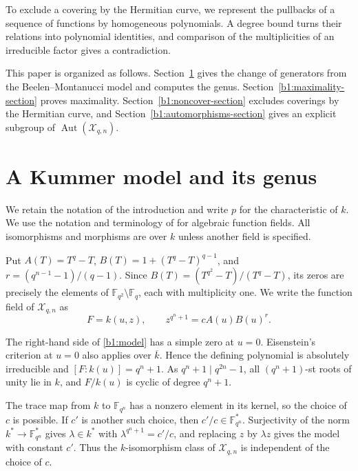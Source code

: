 \documentclass[10pt,a4paper]{amsart}
\numberwithin{equation}{section}
\newcommand{\F}{\mathbb F}
\DeclareMathOperator{\Aut}{Aut}
\begin{document}
To exclude a covering by the Hermitian curve, we represent the
pullbacks of a sequence of functions by homogeneous polynomials.
A degree bound turns their relations into polynomial identities,
and comparison of the multiplicities of an irreducible factor
gives a contradiction.

This paper is organized as follows. Section~\ref{b1:model-section} gives the change of generators from the
Beelen--Montanucci model and computes the genus.
Section~\ref{b1:maximality-section} proves maximality.
Section~\ref{b1:noncover-section} excludes coverings by the Hermitian
curve, and Section~\ref{b1:automorphisms-section} gives an explicit
subgroup of \(\Aut(\mathcal X_{q,n})\).


\section{A Kummer model and its genus}
\label{b1:model-section}

We retain the notation of the introduction and write \(p\) for the
characteristic of \(k\). We use the notation and terminology of
\cite{Stichtenoth2009} for algebraic function fields.
All isomorphisms and morphisms are over \(k\) unless another field
is specified.

Put \(A(T)=T^q-T\), \(B(T)=1+(T^q-T)^{q-1}\), and
\(r=(q^{n-1}-1)/(q-1)\).
Since \(B(T)=(T^{q^2}-T)/(T^q-T)\), its zeros are precisely the
elements of \(\F_{q^2}\setminus\F_q\), each with multiplicity one.
We write the function field of \(\mathcal X_{q,n}\) as
\begin{equation}
\label{b1:model}
 F=k(u,z),\qquad z^{q^n+1}=cA(u)B(u)^r.
\end{equation}

The right-hand side of \eqref{b1:model} has a simple zero at \(u=0\).
Eisenstein's criterion at \(u=0\) also applies over \(\overline k\).
Hence the defining polynomial is absolutely irreducible and
\([F:k(u)]=q^n+1\).
As \(q^n+1\mid q^{2n}-1\), all \((q^n+1)\)-st roots of unity lie in \(k\),
and \(F/k(u)\) is cyclic of degree \(q^n+1\).

The trace map from \(k\) to \(\F_{q^n}\) has a nonzero element in its
kernel, so the choice of \(c\) is possible.  If \(c'\) is another such
choice, then \(c'/c\in\F_{q^n}^*\).  Surjectivity of the norm
\(k^*\to\F_{q^n}^*\) gives \(\lambda\in k^*\) with
\(\lambda^{q^n+1}=c'/c\), and replacing \(z\) by \(\lambda z\)
gives the model with constant \(c'\).
Thus the \(k\)-isomorphism class of \(\mathcal X_{q,n}\) is independent
of the choice of \(c\).
\end{document}
